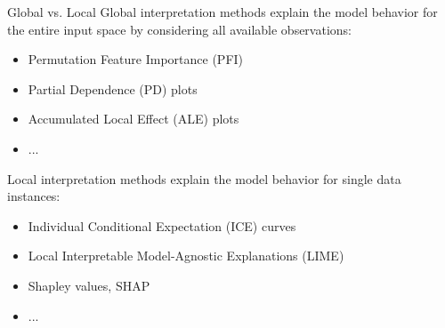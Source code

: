 \documentclass[11pt,compress,t,notes=noshow, aspectratio=169, xcolor=table]{beamer}
\begin{document}
% 
%     
% 


\begin{frame}{Global vs. Local}
Global interpretation methods explain the model behavior for the entire input space by considering all available observations:
	\begin{itemize}
		\item Permutation Feature Importance (PFI)
		\item Partial Dependence (PD) plots
		\item Accumulated Local Effect (ALE) plots
		\item ...
	\end{itemize}
\bigskip
Local interpretation methods explain the model behavior for single data instances:
	\begin{itemize}
		\item Individual Conditional Expectation (ICE) curves
		\item Local Interpretable Model-Agnostic Explanations (LIME)
		\item Shapley values, SHAP
		\item ...
	\end{itemize}
\end{frame}

\end{document}
